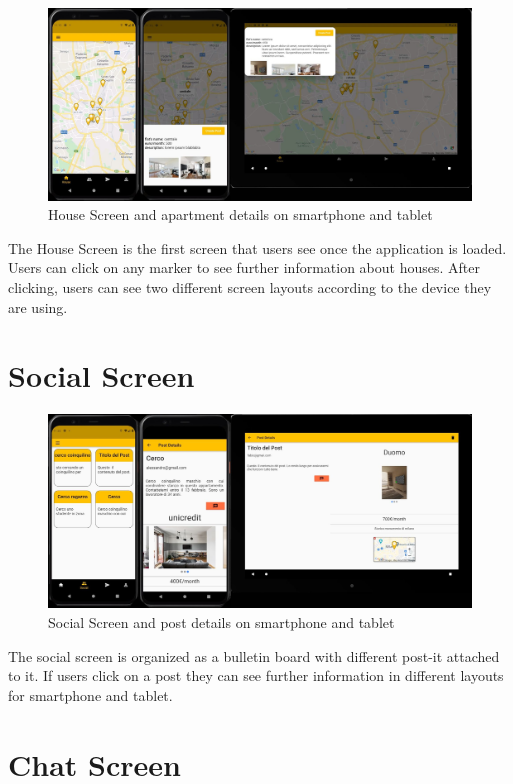 \begin{figure}[H]
    \centering
    \includegraphics[scale = 0.25]{images/housescreen.jpeg}
    \caption{House Screen and apartment details on smartphone and tablet}
\end{figure}
The House Screen is the first screen that users see once the application is loaded. Users can click on any marker to see further information about houses. After clicking, users can see two different screen layouts according to the device they are using.\\

\section{Social Screen}

\begin{figure}[H]
    \centering
    \includegraphics[scale = 0.25]{images/postscreen.jpeg}
    \caption{Social Screen and post details on smartphone and tablet}
\end{figure}
The social screen is organized as a bulletin board with different post-it attached to it. If users click on a post they can see further information in different layouts for smartphone and tablet.\\

\section{Chat Screen}

